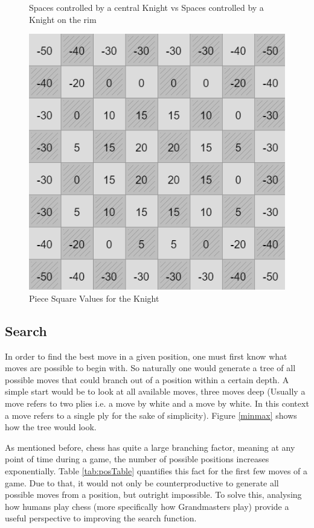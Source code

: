 \begin{figure}[H]
    \caption{Spaces controlled by a central Knight vs Spaces controlled by a Knight on the rim}
    \label{fig: knightPositions}
\end{figure}

\begin{figure}[H]
    \centering
    \includegraphics[scale=0.5]{images/KnightSquareValues.png}
    \caption{Piece Square Values for the Knight \cite{pieceSquares}}
    \label{fig:knightPieceSquareVals}
\end{figure}

\subsection{Search}

In order to find the best move in a given position, one must first know what moves are possible to begin with. So naturally one would generate a tree of all possible moves that could branch out of a position within a certain depth. A simple start would be to look at all available moves, three moves deep (Usually a move refers to two plies i.e. a move by white and a move by white. In this context a move refers to a single ply for the sake of simplicity). Figure \ref{minmax} shows how the tree would look.

As mentioned before, chess has quite a large branching factor, meaning at any point of time during a game, the number of possible positions increases exponentially. Table \ref{tab:posTable} quantifies this fact for the first few moves of a game. Due to that, it would not only be counterproductive to generate all possible moves from a position, but outright impossible. To solve this, analysing how humans play chess (more specifically how Grandmasters play) provide a useful perspective to improving the search function.

